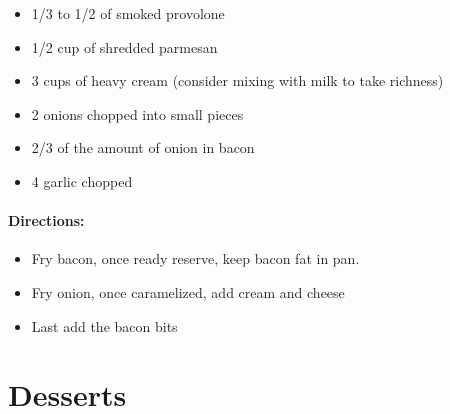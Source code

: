 \documentclass{article}
\begin{document}
\begin{itemize}
	\item 1/3 to 1/2 of smoked provolone
	\item 1/2 cup of shredded parmesan
	\item 3 cups of heavy cream (consider mixing with milk to take richness)
	\item 2 onions chopped into small pieces
	\item 2/3 of the amount of onion in bacon
	\item 4 garlic chopped
\end{itemize}

\paragraph{Directions:}
\begin{itemize}
	\item Fry bacon, once ready reserve, keep bacon fat in pan.
	\item Fry onion, once caramelized, add cream and cheese
	\item Last add the bacon bits
\end{itemize}

\section{Desserts}

\newcommand{\mousse}[3]{
\subsection{Chocolate Mousse}

\paragraph{Ingredients:}

\begin{itemize}
	\item 1 can of condensed milk
	\item 1 can of "Crema de leche"
	\item #2
\end{itemize}

\paragraph{Directions:}
\begin{itemize}
	\item Blend all ingredients on a blender.
\end{itemize}

\paragraph{Note: #3}
}
\end{document}
